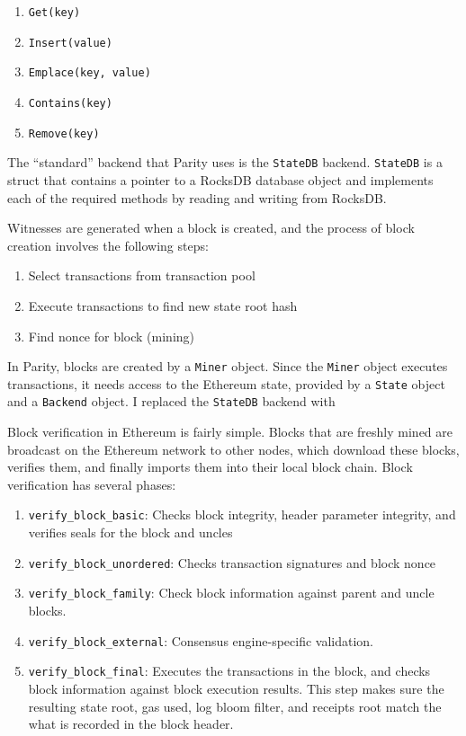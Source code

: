 \documentclass[12pt]{article}
\begin{document}
\begin{enumerate}
  \item \texttt{Get(key)}
  \item \texttt{Insert(value)}
  \item \texttt{Emplace(key, value)}
  \item \texttt{Contains(key)}
  \item \texttt{Remove(key)}
\end{enumerate}

The ``standard'' backend that Parity uses is the \texttt{StateDB} backend. \texttt{StateDB} is a struct that contains a pointer to a RocksDB database object and implements each of the required methods by reading and writing from RocksDB.


Witnesses are generated when a block is created, and the process of block creation involves the following steps:
\begin{enumerate}
  \item Select transactions from transaction pool
  \item Execute transactions to find new state root hash
  \item Find nonce for block (mining)
\end{enumerate}
In Parity, blocks are created by a \texttt{Miner} object. Since the \texttt{Miner} object executes transactions, it needs access to the Ethereum state, provided by a \texttt{State} object and a \texttt{Backend} object. I replaced the \texttt{StateDB} backend with %

Block verification in Ethereum is fairly simple. Blocks that are freshly mined are broadcast on the Ethereum network to other nodes, which download these blocks, verifies them, and finally imports them into their local block chain. Block verification has several phases:
\begin{enumerate}
  \item \texttt{verify\_block\_basic}: Checks block integrity, header parameter integrity, and verifies seals for the block and uncles
  \item \texttt{verify\_block\_unordered}: Checks transaction signatures and block nonce
  \item \texttt{verify\_block\_family}: Check block information against parent and uncle blocks.
  \item \texttt{verify\_block\_external}: Consensus engine-specific validation.
  \item \texttt{verify\_block\_final}: Executes the transactions in the block, and checks block information against block execution results. This step makes sure the resulting state root, gas used, log bloom filter, and receipts root match the what is recorded in the block header.
\end{enumerate}
\end{document}
